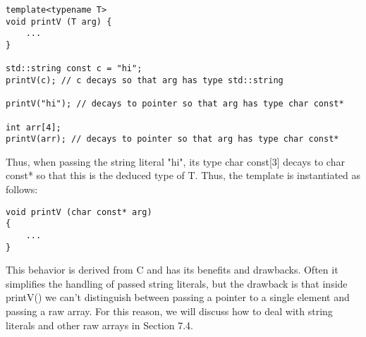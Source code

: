 \begin{lstlisting}[style=styleCXX]
template<typename T>
void printV (T arg) {
	...
}

std::string const c = "hi";
printV(c); // c decays so that arg has type std::string

printV("hi"); // decays to pointer so that arg has type char const*

int arr[4];
printV(arr); // decays to pointer so that arg has type char const*
\end{lstlisting}

Thus, when passing the string literal "hi", its type char const[3] decays to char const* so that this is the deduced type of T. Thus, the template is instantiated as follows:

\begin{lstlisting}[style=styleCXX]
void printV (char const* arg)
{
	...
}
\end{lstlisting}

This behavior is derived from C and has its benefits and drawbacks. Often it simplifies the handling of passed string literals, but the drawback is that inside printV() we can’t distinguish between passing a pointer to a single element and passing a raw array. For this reason, we will discuss how to deal with string literals and other raw arrays in Section 7.4.




